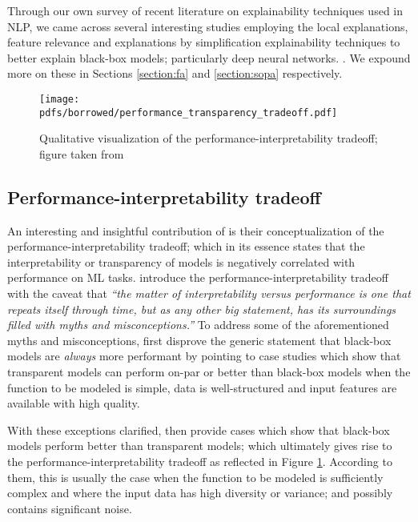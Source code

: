Through our own survey of recent literature on explainability techniques used in
NLP, we came across several interesting studies employing the local
explanations, feature relevance and explanations by simplification
explainability techniques to better explain black-box models; particularly deep
neural networks.
\citep{schwartz2018sopa,peng2018rational,suresh-etal-2019-distilling,wang2019state,jiang2020cold}.
We expound more on these in Sections \ref{section:fa} and \ref{section:sopa}
respectively.

\begin{figure}[t]
  \centering
  \texttt{[image: pdfs/borrowed/performance\_transparency\_tradeoff.pdf]}
  \caption{Qualitative visualization of the performance-interpretability tradeoff;
    figure taken from \citet{arrieta2020explainable}}
  \label{fig:performance_interpretability_tradeoff}
\end{figure}

\subsection{Performance-interpretability tradeoff}

\label{section:performance_interpretability_tradeoff}

An interesting and insightful contribution of \citet{arrieta2020explainable} is
their conceptualization of the performance-interpretability tradeoff; which in
its essence states that the interpretability or transparency of models is
negatively correlated with performance on ML tasks. \citet[Page 18, Section
5.1]{arrieta2020explainable} introduce the performance-interpretability tradeoff
with the caveat that \textit{``the matter of interpretability versus performance
  is one that repeats itself through time, but as any other big statement, has
  its surroundings filled with myths and misconceptions.''} To address some of
the aforementioned myths and misconceptions, \citet{arrieta2020explainable}
first disprove the generic statement that black-box models are
\textit{always} more performant by pointing to case studies which show that
transparent models can perform on-par or better than black-box models when the
function to be modeled is simple, data is well-structured and input
features are available with high quality.

With these exceptions clarified, \citet{arrieta2020explainable} then provide cases
which show that black-box models perform better than transparent models; which
ultimately gives rise to the performance-interpretability tradeoff as
reflected in Figure \ref{fig:performance_interpretability_tradeoff}. According to
them, this is usually the case when the function to be modeled is sufficiently
complex and where the input data has high diversity or variance; and possibly
contains significant noise.

